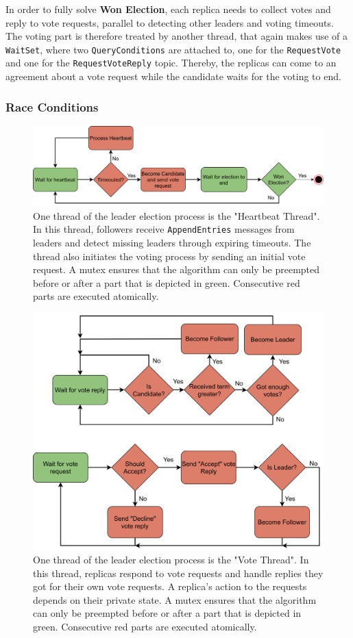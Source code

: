In order to fully solve \textbf{Won Election}, each replica needs to collect votes and reply to vote requests, parallel to detecting other leaders and voting timeouts.
The voting part is therefore treated by another  thread, that again makes use of a \texttt{WaitSet}, where two \texttt{QueryConditions} are attached to, one for the \texttt{RequestVote} and one for the \texttt{RequestVoteReply} topic.
Thereby, the replicas can come to an agreement about a vote request while the candidate waits for the voting to end.

\subsubsection{Race Conditions}
\begin{figure}[!hb]
	\centering
	\includegraphics[width=0.75\linewidth]{images/LeaderElectionHeartbeatThread}
	\caption{One  thread of the leader election process is the "Heartbeat Thread". In this thread, followers receive \texttt{AppendEntries} messages from leaders and detect missing leaders through expiring timeouts. The thread also initiates the voting process by sending an initial vote request. A mutex ensures that the algorithm can only be preempted before or after a part that is depicted in green. Consecutive red parts are executed atomically.}
	\label{fig:LeaderElectionHeartbeatThread}
\end{figure}

\begin{figure}[!hb]
	\centering
	\includegraphics[width=0.75\linewidth]{images/LeaderElectionVoteThread}
	\caption{One  thread of the leader election process is the "Vote Thread". In this thread, replicas respond to vote requests and handle replies they got for their own vote requests. A replica's action to the requests depends on their private state. A mutex ensures that the algorithm can only be preempted before or after a part that is depicted in green. Consecutive red parts are executed atomically.}
	\label{fig:LeaderElectionVoteThread}
\end{figure}

